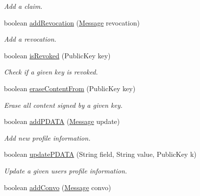 \begin{DoxyCompactItemize}
\begin{DoxyCompactList}\small\item\em Add a claim. \end{DoxyCompactList}\item 
boolean \hyperlink{classballmerpeak_1_1turtlenet_1_1server_1_1Database_ac4eeb9a2d74bd6cfe1e72f63fc93243b}{add\-Revocation} (\hyperlink{classballmerpeak_1_1turtlenet_1_1shared_1_1Message}{Message} revocation)
\begin{DoxyCompactList}\small\item\em Add a revocation. \end{DoxyCompactList}\item 
boolean \hyperlink{classballmerpeak_1_1turtlenet_1_1server_1_1Database_ab3e267a71350c940b476949722eda0eb}{is\-Revoked} (Public\-Key key)
\begin{DoxyCompactList}\small\item\em Check if a given key is revoked. \end{DoxyCompactList}\item 
boolean \hyperlink{classballmerpeak_1_1turtlenet_1_1server_1_1Database_a6b4d12d2583d01113c6ba154a94261af}{erase\-Content\-From} (Public\-Key key)
\begin{DoxyCompactList}\small\item\em Erase all content signed by a given key. \end{DoxyCompactList}\item 
boolean \hyperlink{classballmerpeak_1_1turtlenet_1_1server_1_1Database_a051ccb269be2f30af05fe554b83597a5}{add\-P\-D\-A\-T\-A} (\hyperlink{classballmerpeak_1_1turtlenet_1_1shared_1_1Message}{Message} update)
\begin{DoxyCompactList}\small\item\em Add new profile information. \end{DoxyCompactList}\item 
boolean \hyperlink{classballmerpeak_1_1turtlenet_1_1server_1_1Database_a54a5e6c02389fb8f3528bf503019f7fe}{update\-P\-D\-A\-T\-A} (String field, String value, Public\-Key k)
\begin{DoxyCompactList}\small\item\em Update a given users profile information. \end{DoxyCompactList}\item 
boolean \hyperlink{classballmerpeak_1_1turtlenet_1_1server_1_1Database_a4a18cb43547e71e48bbf7269b3e5d560}{add\-Convo} (\hyperlink{classballmerpeak_1_1turtlenet_1_1shared_1_1Message}{Message} convo)

\end{DoxyCompactItemize}

